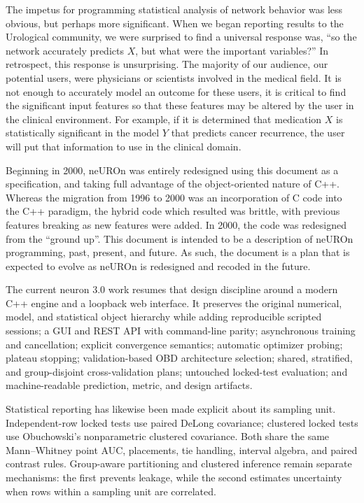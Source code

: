 \documentclass{report}
\begin{document}
The impetus for programming statistical analysis of network behavior
was less obvious, but perhaps more significant.  When we began
reporting results to the Urological community, we were surprised to
find a universal response was, ``so the network accurately predicts
$X$, but what were the important variables?''  In retrospect, this
response is unsurprising.  The majority of our audience, our potential
users, were physicians or scientists involved in the medical field.
It is not enough to accurately model an outcome for these users, it is
critical to find the significant input features so that these features
may be altered by the user in the clinical environment.  For example,
if it is determined that medication $X$ is statistically significant
in the model $Y$ that predicts cancer recurrence, the user will put
that information to use in the clinical domain.

Beginning in 2000, neUROn was entirely redesigned using this document
as a specification, and taking full advantage of the object-oriented
nature of C++.  Whereas the migration from 1996 to 2000 was an
incorporation of C code into the C++ paradigm, the hybrid code which
resulted was brittle, with previous features breaking as new features
were added.  In 2000, the code was redesigned from the ``ground up''.
This document is intended to be a description of neUROn programming,
past, present, and future.  As such, the document is a plan that is
expected to evolve as neUROn is redesigned and recoded in the future.

The current neuron 3.0 work resumes that design discipline around a modern C++
engine and a loopback web interface.  It preserves the original numerical,
model, and statistical object hierarchy while adding reproducible scripted
sessions; a GUI and REST API with command-line parity; asynchronous training and
cancellation; explicit convergence semantics; automatic optimizer probing;
plateau stopping; validation-based OBD architecture selection; shared,
stratified, and group-disjoint cross-validation plans; untouched locked-test
evaluation; and machine-readable prediction, metric, and design artifacts.

Statistical reporting has likewise been made explicit about its sampling unit.
Independent-row locked tests use paired DeLong covariance; clustered locked
tests use Obuchowski's nonparametric clustered covariance.  Both share the same
Mann--Whitney point AUC, placements, tie handling, interval algebra, and paired
contrast rules.  Group-aware partitioning and clustered inference remain
separate mechanisms: the first prevents leakage, while the second estimates
uncertainty when rows within a sampling unit are correlated.
\end{document}
